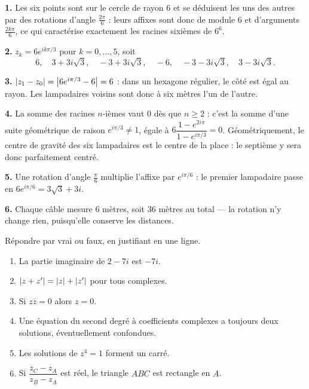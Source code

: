 \begin{corrige}
\textbf{1.} Les six points sont sur le cercle de rayon $6$ et se déduisent
les uns des autres par des rotations d'angle $\frac{2\pi}{6}$ : leurs affixes
sont donc de module $6$ et d'arguments $\frac{2k\pi}{6}$, ce qui caractérise
exactement les racines sixièmes de $6^{6}$.

\textbf{2.} $z_{k} = 6e^{ik\pi/3}$ pour $k = 0,\dots,5$, soit
\[
  6, \quad 3+3i\sqrt3, \quad -3+3i\sqrt3, \quad -6, \quad -3-3i\sqrt3,
  \quad 3-3i\sqrt3 .
\]

\textbf{3.} $\left|z_{1}-z_{0}\right| = \left|6e^{i\pi/3}-6\right| = 6$ : dans un hexagone
régulier, le côté est égal au rayon. Les lampadaires voisins sont donc à six
mètres l'un de l'autre.

\textbf{4.} La somme des racines $n$-ièmes vaut $0$ dès que $n \geq 2$ :
c'est la somme d'une suite géométrique de raison $e^{i\pi/3} \neq 1$, égale à
$6\dfrac{1-e^{2i\pi}}{1-e^{i\pi/3}} = 0$. Géométriquement, le centre de
gravité des six lampadaires est le centre de la place : le septième y sera
donc parfaitement centré.

\textbf{5.} Une rotation d'angle $\frac{\pi}{6}$ multiplie l'affixe par
$e^{i\pi/6}$ : le premier lampadaire passe en $6e^{i\pi/6}
= 3\sqrt3+3i$.

\textbf{6.} Chaque câble mesure $6$ mètres, soit $36$ mètres au total —
la rotation n'y change rien, puisqu'elle conserve les distances.
\end{corrige}

\begin{jemeteste}
Répondre par vrai ou faux, en justifiant en une ligne.

\begin{enumerate}[label=\textbf{\arabic*.}, leftmargin=*, itemsep=0.28em]
  \item La partie imaginaire de $2-7i$ est $-7i$.
  \item $\left|z+z'\right| = \left|z\right|+\left|z'\right|$ pour tous complexes.
  \item Si $z\overline z = 0$ alors $z = 0$.
  \item Une équation du second degré à coefficients complexes a toujours deux
        solutions, éventuellement confondues.
  \item Les solutions de $z^{4} = 1$ forment un carré.
  \item Si $\dfrac{z_{C}-z_{A}}{z_{B}-z_{A}}$ est réel, le triangle $ABC$ est
        rectangle en $A$.
\end{enumerate}
\end{jemeteste}

